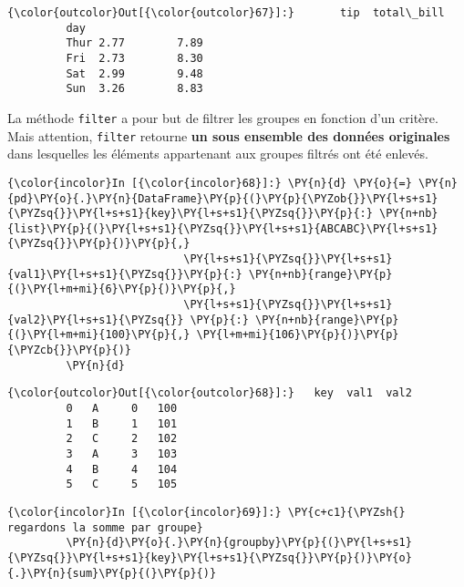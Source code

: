 \begin{Verbatim}[commandchars=\\\{\},frame=single,framerule=0.3mm,rulecolor=\color{cellframecolor}]
{\color{outcolor}Out[{\color{outcolor}67}]:}       tip  total\_bill
         day                  
         Thur 2.77        7.89
         Fri  2.73        8.30
         Sat  2.99        9.48
         Sun  3.26        8.83
\end{Verbatim}
            
    La méthode \texttt{filter} a pour but de filtrer les groupes en fonction
d'un critère. Mais attention, \texttt{filter} retourne \textbf{un sous
ensemble des données originales} dans lesquelles les éléments
appartenant aux groupes filtrés ont été enlevés.

    \begin{Verbatim}[commandchars=\\\{\},frame=single,framerule=0.3mm,rulecolor=\color{cellframecolor}]
{\color{incolor}In [{\color{incolor}68}]:} \PY{n}{d} \PY{o}{=} \PY{n}{pd}\PY{o}{.}\PY{n}{DataFrame}\PY{p}{(}\PY{p}{\PYZob{}}\PY{l+s+s1}{\PYZsq{}}\PY{l+s+s1}{key}\PY{l+s+s1}{\PYZsq{}}\PY{p}{:} \PY{n+nb}{list}\PY{p}{(}\PY{l+s+s1}{\PYZsq{}}\PY{l+s+s1}{ABCABC}\PY{l+s+s1}{\PYZsq{}}\PY{p}{)}\PY{p}{,} 
                           \PY{l+s+s1}{\PYZsq{}}\PY{l+s+s1}{val1}\PY{l+s+s1}{\PYZsq{}}\PY{p}{:} \PY{n+nb}{range}\PY{p}{(}\PY{l+m+mi}{6}\PY{p}{)}\PY{p}{,}
                           \PY{l+s+s1}{\PYZsq{}}\PY{l+s+s1}{val2}\PY{l+s+s1}{\PYZsq{}} \PY{p}{:} \PY{n+nb}{range}\PY{p}{(}\PY{l+m+mi}{100}\PY{p}{,} \PY{l+m+mi}{106}\PY{p}{)}\PY{p}{\PYZcb{}}\PY{p}{)}
         \PY{n}{d}
\end{Verbatim}


\begin{Verbatim}[commandchars=\\\{\},frame=single,framerule=0.3mm,rulecolor=\color{cellframecolor}]
{\color{outcolor}Out[{\color{outcolor}68}]:}   key  val1  val2
         0   A     0   100
         1   B     1   101
         2   C     2   102
         3   A     3   103
         4   B     4   104
         5   C     5   105
\end{Verbatim}
            
    \begin{Verbatim}[commandchars=\\\{\},frame=single,framerule=0.3mm,rulecolor=\color{cellframecolor}]
{\color{incolor}In [{\color{incolor}69}]:} \PY{c+c1}{\PYZsh{} regardons la somme par groupe}
         \PY{n}{d}\PY{o}{.}\PY{n}{groupby}\PY{p}{(}\PY{l+s+s1}{\PYZsq{}}\PY{l+s+s1}{key}\PY{l+s+s1}{\PYZsq{}}\PY{p}{)}\PY{o}{.}\PY{n}{sum}\PY{p}{(}\PY{p}{)}
\end{Verbatim}


